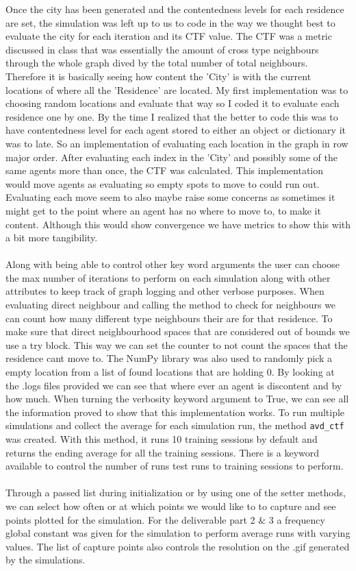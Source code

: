 \documentclass[letterpaper]{article}
\begin{document}
Once the city has been generated and the contentedness levels for each residence are set, the simulation was left up to us to code in the way we thought best to evaluate the city for each iteration and its CTF value. The CTF was a metric discussed in class that was essentially the amount of cross type neighbours through the whole graph dived by the total number of total neighbours.  Therefore it is basically seeing how content the 'City' is with the current locations of where all the 'Residence' are located.  My first implementation was to choosing random locations and evaluate that way so I coded it to evaluate each residence one by one.  By the time I realized that the better to code this was to have contentedness level for each agent stored to either an object or dictionary it was to late.  So an implementation of evaluating each location in the graph in row major order.  After evaluating each index in the 'City' and possibly some of the same agents more than once, the CTF was calculated.  This implementation would move agents as evaluating so empty spots to move to could run out.  Evaluating each move seem to also maybe raise some concerns as sometimes it might get to the point where an agent has no where to move to, to make it content.  Although this would show convergence we have metrics to show this with a bit more tangibility.\\\\
Along with being able to control other key word arguments the user can choose the max number of iterations to perform on each simulation along with other attributes to keep track of graph logging and other verbose purposes. When evaluating direct neighbour and calling the method to check for neighbours we can count how many different type neighbours their are for that residence.  To make sure that direct neighbourhood spaces that are considered out of bounds we use a try block.  This way we can set the counter to not count the spaces that the residence cant move to.  The NumPy library was also used to randomly pick a empty location from a list of found locations that are holding 0.  By looking at the .logs files provided we can see that where ever an agent is discontent and by how much.  When turning the verbosity keyword argument to True, we can see all the information proved to show that this implementation works. To run multiple simulations and collect the average for each simulation run, the method \texttt{avd\_ctf} was created.  With this method, it runs 10 training sessions by default and returns the ending average for all the training sessions. There is a keyword available to control the number of runs test runs to training sessions to perform.\\\\
Through a passed list during initialization or by using one of the setter methods, we can select how often or at which points we would like to to capture and see points plotted for the simulation.  For the deliverable part 2 \& 3 a frequency global constant was given for the simulation to perform average runs with varying values.  The list of capture points also controls the resolution on the .gif generated by the simulations. 
 
\end{document}
